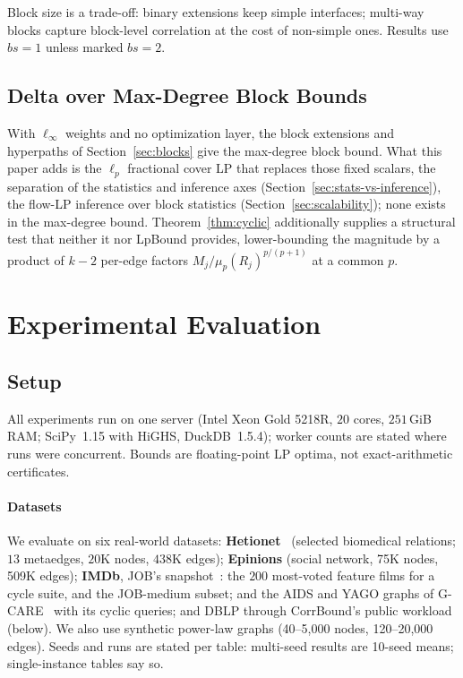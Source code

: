 \documentclass[conference]{IEEEtran}
\newcommand{\rel}{R}
\begin{document}
Block size is a trade-off: binary extensions keep simple
interfaces; multi-way blocks capture block-level correlation at the cost
of non-simple ones. Results use $bs{=}1$ unless marked $bs{=}2$.

\subsection{Delta over Max-Degree Block Bounds}

With $\ell_\infty$ weights and no optimization layer, the block extensions
and hyperpaths of Section~\ref{sec:blocks} give the max-degree block bound.
What this paper adds is the $\ell_p$ fractional cover
LP that replaces those fixed scalars, the separation of the statistics and
inference axes (Section~\ref{sec:stats-vs-inference}), the flow-LP
inference over block statistics (Section~\ref{sec:scalability});
none exists in the max-degree bound. Theorem~\ref{thm:cyclic}
additionally supplies a structural test that neither it nor LpBound provides,
lower-bounding the magnitude by a product of $k-2$ per-edge factors
$M_j / \mu_p(\rel_j)^{p/(p+1)}$ at a common $p$.

\section{Experimental Evaluation}
\label{sec:experiments}

\subsection{Setup}
All experiments run on one server (Intel Xeon Gold 5218R, $20$ cores, $251$\,GiB RAM; SciPy~1.15 with HiGHS, DuckDB~1.5.4); worker counts are stated where runs were concurrent. Bounds are floating-point LP optima, not exact-arithmetic certificates.

\paragraph{Datasets}
We evaluate on six real-world datasets:
\textbf{Hetionet}~\cite{himmelstein2017hetionet} (selected biomedical relations; $13$ metaedges, $20$K nodes, $438$K edges);
\textbf{Epinions} (social network, 75K nodes, 509K edges);
\textbf{IMDb}, JOB's snapshot~\cite{leis2015goodare}: the $200$
most-voted feature films for a cycle suite, and the JOB-medium subset;
and the AIDS and YAGO graphs of G-CARE~\cite{park2020gcare} with its
cyclic queries; and DBLP through CorrBound's public workload (below).
We also use synthetic power-law graphs (40--5{,}000 nodes, 120--20{,}000 edges).
Seeds and runs are stated per table: multi-seed results are 10-seed
means; single-instance tables say so.
\end{document}

